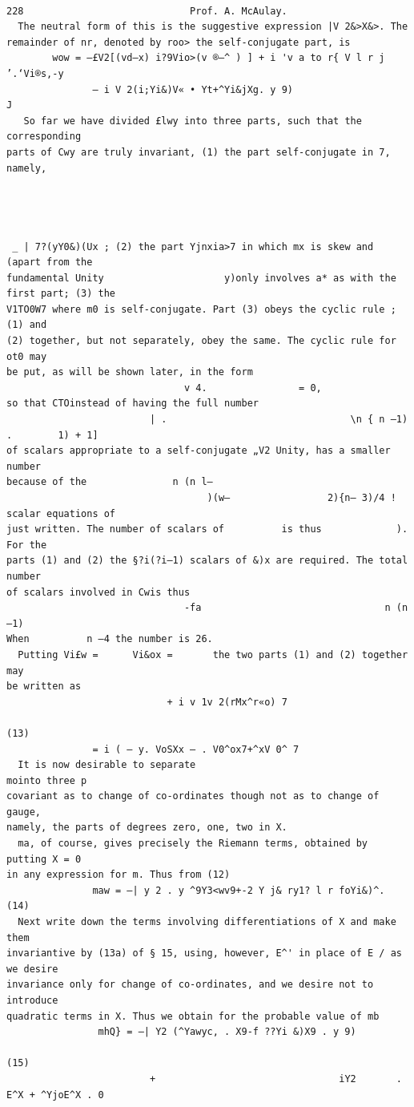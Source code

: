 \documentclass[10pt]{article}
\begin{document}
\clearpage
\begin{verbatim}

228                             Prof. A. McAulay.
  The neutral form of this is the suggestive expression |V 2&>X&>. The
remainder of nr, denoted by roo> the self-conjugate part, is
        wow = —£V2[(vd—x) i?9Vio>(v ®—^ ) ] + i 'v a to r{ V l r j ’.‘Vi®s,-y
               — i V 2(i;Yi&)V« • Yt+^Yi&jXg. y 9)                         J
   So far we have divided £lwy into three parts, such that the corresponding
parts of Cwy are truly invariant, (1) the part self-conjugate in 7, namely,




 _ | 7?(yY0&)(Ux ; (2) the part Yjnxia>7 in which mx is skew and (apart from the
fundamental Unity                     y)only involves a* as with the first part; (3) the
V1TO0W7 where m0 is self-conjugate. Part (3) obeys the cyclic rule ; (1) and
(2) together, but not separately, obey the same. The cyclic rule for ot0 may
be put, as will be shown later, in the form
                               v 4.                = 0,
so that CTOinstead of having the full number
                         | .                                \n { n —1) .        1) + 1]
of scalars appropriate to a self-conjugate „V2 Unity, has a smaller number
because of the               n (n l—
                                   )(w—                 2){n— 3)/4 ! scalar equations of
just written. The number of scalars of          is thus             ). For the
parts (1) and (2) the §?i(?i—1) scalars of &)x are required. The total number
of scalars involved in Cwis thus
                               -fa                                n (n—1)
When          n —4 the number is 26.
  Putting Vi£w =      Vi&ox =       the two parts (1) and (2) together may
be written as
                            + i v 1v 2(rMx^r«o) 7
                                                                       (13)
               = i ( — y. VoSXx — . V0^ox7+^xV 0^ 7
  It is now desirable to separate                                     mointo three p
covariant as to change of co-ordinates though not as to change of gauge,
namely, the parts of degrees zero, one, two in X.
  ma, of course, gives precisely the Riemann terms, obtained by putting X = 0
in any expression for m. Thus from (12)
               maw = —| y 2 . y ^9Y3<wv9+-2 Y j& ry1? l r foYi&)^.                 (14)
  Next write down the terms involving differentiations of X and make them
invariantive by (13a) of § 15, using, however, E^' in place of E / as we desire
invariance only for change of co-ordinates, and we desire not to introduce
quadratic terms in X. Thus we obtain for the probable value of mb
                mhQ} = —| Y2 (^Yawyc, . X9-f ??Yi &)X9 . y 9)
                                                                                   (15)
                         +                                iY2       . E^X + ^YjoE^X . 0


\end{verbatim}
\end{document}
